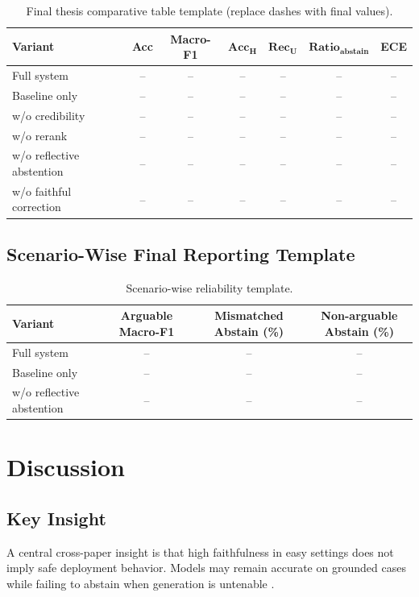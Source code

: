 \documentclass[12pt,a4paper,oneside]{report}
\begin{document}
\begin{table}[htbp]
\centering
\caption{Final thesis comparative table template (replace dashes with final values).}
\label{tab:final-template}
\begin{tabular}{lcccccc}
\toprule
\textbf{Variant} & \textbf{Acc} & \textbf{Macro-F1} & $\mathbf{Acc_H}$ & $\mathbf{Rec_U}$ & $\mathbf{Ratio_{abstain}}$ & \textbf{ECE} \\
\midrule
Full system & -- & -- & -- & -- & -- & -- \\
Baseline only & -- & -- & -- & -- & -- & -- \\
w/o credibility & -- & -- & -- & -- & -- & -- \\
w/o rerank & -- & -- & -- & -- & -- & -- \\
w/o reflective abstention & -- & -- & -- & -- & -- & -- \\
w/o faithful correction & -- & -- & -- & -- & -- & -- \\
\bottomrule
\end{tabular}
\end{table}

\section{Scenario-Wise Final Reporting Template}
\begin{table}[htbp]
\centering
\caption{Scenario-wise reliability template.}
\label{tab:scenario-template}
\begin{tabular}{lccc}
\toprule
\textbf{Variant} & \textbf{Arguable Macro-F1} & \textbf{Mismatched Abstain (\%)} & \textbf{Non-arguable Abstain (\%)} \\
\midrule
Full system & -- & -- & -- \\
Baseline only & -- & -- & -- \\
w/o reflective abstention & -- & -- & -- \\
\bottomrule
\end{tabular}
\end{table}

\chapter{Discussion}
\label{chap:discussion}

\section{Key Insight}
A central cross-paper insight is that high faithfulness in easy settings does not imply safe deployment behavior.
Models may remain accurate on grounded cases while failing to abstain when generation is untenable \citep{zhang2025faithfulness,zhang2025reflective}.
\end{document}
